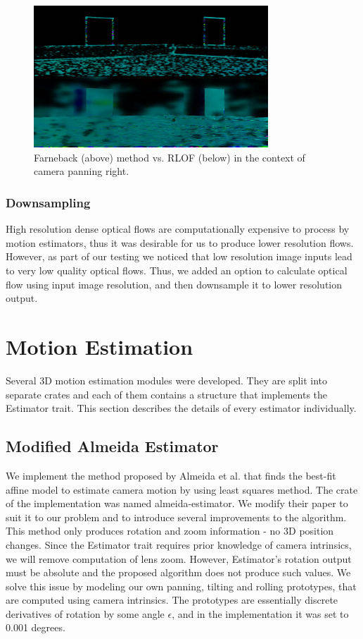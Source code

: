 \documentclass[11pt,english]{report}
\begin{document}
\begin{figure}[!ht]
	\centering
	\includegraphics[width=250pt]{docs/report/farneback-vs-rlof.jpg}
	\caption{\centering Farneback (above) method vs. RLOF (below) in the context of camera panning right.}
\end{figure}

\subsubsection{Downsampling}

High resolution dense optical flows are computationally expensive to process by motion estimators, thus it was desirable for us to produce lower resolution flows. However, as part of our testing we noticed that low resolution image inputs lead to very low quality optical flows. Thus, we added an option to calculate optical flow using input image resolution, and then downsample it to lower resolution output.

\section{Motion Estimation}

Several 3D motion estimation modules were developed. They are split into separate crates and each of them contains a structure that implements the Estimator trait. This section describes the details of every estimator individually.

\subsection{Modified Almeida Estimator}

We implement the method proposed by Almeida et al. that finds the best-fit affine model to estimate camera motion by using least squares method\cite{almeida}. The crate of the implementation was named almeida-estimator. We modify their paper to suit it to our problem and to introduce several improvements to the algorithm. This method only produces rotation and zoom information - no 3D position changes. Since the Estimator trait requires prior knowledge of camera intrinsics, we will remove computation of lens zoom. However, Estimator's rotation output must be absolute and the proposed algorithm does not produce such values. We solve this issue by modeling our own panning, tilting and rolling prototypes, that are computed using camera intrinsics. The prototypes are essentially discrete derivatives of rotation by some angle $\epsilon$, and in the implementation it was set to 0.001 degrees.
\end{document}
